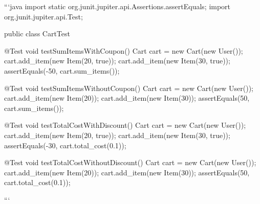 \begin{answer}
```java
import static org.junit.jupiter.api.Assertions.assertEquals;
import org.junit.jupiter.api.Test;

public class CartTest {

  @Test
  void testSumItemsWithCoupon() {
      Cart cart = new Cart(new User());
      cart.add_item(new Item(20, true));
      cart.add_item(new Item(30, true));
      assertEquals(-50, cart.sum_items());
  }

  @Test
  void testSumItemsWithoutCoupon() {
      Cart cart = new Cart(new User());
      cart.add_item(new Item(20));
      cart.add_item(new Item(30));
      assertEquals(50, cart.sum_items());
  }

  @Test
  void testTotalCostWithDiscount() {
      Cart cart = new Cart(new User());
      cart.add_item(new Item(20, true));
      cart.add_item(new Item(30, true));
      assertEquals(-30, cart.total_cost(0.1));
  }

  @Test
  void testTotalCostWithoutDiscount() {
      Cart cart = new Cart(new User());
      cart.add_item(new Item(20));
      cart.add_item(new Item(30));
      assertEquals(50, cart.total_cost(0.1));
  }
}
``` 
\end{answer}